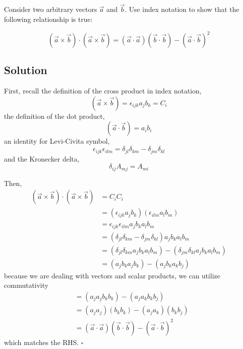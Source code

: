 \section{}
Consider two arbitrary vectors $\vec{a}$ and $\vec{b}$. Use index notation to
show that the following relationship is true:

\begin{equation*}
    (\vec{a} \times \vec{b}) \cdot (\vec{a} \times \vec{b}) = (\vec{a} \cdot \vec{a})(\vec{b} \cdot \vec{b}) - (\vec{a} \cdot \vec{b})^2
\end{equation*}

\subsection*{Solution}
First, recall the definition of the cross product in index notation,
\begin{equation*}
    (\vec{a} \times \vec{b}) = \epsilon_{ijk} a_j b_k = C_i
\end{equation*}
the definition of the dot product,
\begin{equation*}
    (\vec{a} \cdot \vec{b}) = a_i b_i
\end{equation*}
an identity for Levi-Civita symbol,
\begin{equation*}
    \epsilon_{ijk} \epsilon_{ilm} = \delta_{jl} \delta_{km} - \delta_{jm} \delta_{kl}
\end{equation*}
and the Kronecker delta,
\begin{equation*}
    \delta_{ij} A_{mj} = A_{mi}
\end{equation*}

Then, 
\begin{align*}
    (\vec{a} \times \vec{b}) \cdot (\vec{a} \times \vec{b}) &= C_i C_i \\
    &= (\epsilon_{ijk} a_j b_k) (\epsilon_{ilm} a_l b_m) \\
    &= \epsilon_{ijk} \epsilon_{ilm} a_j b_k a_l b_m \\
    &= (\delta_{jl} \delta_{km} - \delta_{jm} \delta_{kl}) a_j b_k a_l b_m \\
    &= (\delta_{jl} \delta_{km} a_j b_k a_l b_m) - (\delta_{jm} \delta_{kl} a_j b_k a_l b_m) \\
    &= (a_j b_k a_j b_k) - (a_j b_k a_k b_j) 
\end{align*}
because we are dealing with vectors and scalar products, we can utilize commutativity 
\begin{align*}
    &= (a_j a_j b_k b_k) - (a_j a_k b_k b_j) \\
    &= (a_j a_j) (b_k b_k) - (a_j a_k) (b_k b_j) \\
    &= (\vec{a} \cdot \vec{a}) (\vec{b} \cdot \vec{b}) - (\vec{a} \cdot \vec{b})^2
\end{align*}
which matches the RHS. $\square$